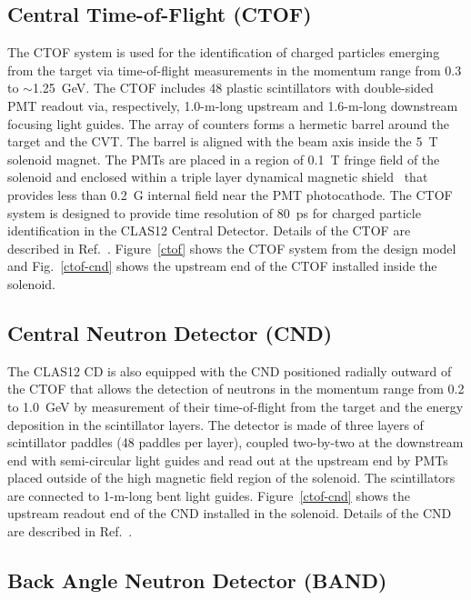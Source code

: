 \documentclass[final,3p,twocolumn]{elsarticle}
\begin{document}
\subsection{Central Time-of-Flight (CTOF)}

The CTOF system is used for the identification of charged particles emerging from the target via time-of-flight
measurements in the momentum range from 0.3 to $\sim$1.25~GeV. The CTOF includes 48 plastic scintillators with
double-sided PMT readout via, respectively, 1.0-m-long upstream and 1.6-m-long downstream focusing light guides.
The array of counters forms a hermetic barrel around the target and the CVT. The barrel is aligned with the beam
axis inside the 5~T solenoid magnet. The PMTs are placed in a region of 0.1~T fringe field of the solenoid and
enclosed within a triple layer dynamical magnetic shield~\cite{Baturin:2012zz} that provides less than 0.2~G
internal field near the PMT photocathode. The CTOF system is designed to provide time resolution of 80~ps for
charged particle identification in the CLAS12 Central Detector. Details of the CTOF are described in
Ref.~\cite{ctof-nim}. Figure~\ref{ctof} shows the CTOF system from the design model and Fig.~\ref{ctof-cnd}
shows the upstream end of the CTOF installed inside the solenoid.

\subsection{Central Neutron Detector (CND)}

The CLAS12 CD is also equipped with the CND positioned radially outward of the CTOF that allows the detection
of neutrons in the momentum range from 0.2 to 1.0~GeV by measurement of their time-of-flight from the target
and the energy deposition in the scintillator layers. The detector is made of three layers of scintillator paddles
(48 paddles per layer), coupled two-by-two at the downstream end with semi-circular light guides and read out at
the upstream end by PMTs placed outside of the high magnetic field region of the solenoid. The scintillators are
connected to 1-m-long bent light guides. Figure~\ref{ctof-cnd} shows the upstream readout end of the
CND installed in the solenoid. Details of the CND are described in Ref.~\cite{cnd-nim}.

\subsection{Back Angle Neutron Detector (BAND)}
\end{document}

